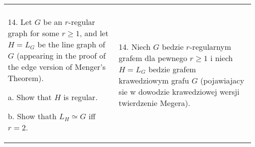 \documentclass{article}[13pt]
\begin{document}
\begin{tabularx}{\textwidth}{ X X }
        & \\

        14. Let $G$ be an $r$-regular graph for some $r\geq1$, and let $H=L_G$ be the line graph of $G$ (appearing in the proof of the edge version of Menger's Theorem). 

        a. Show that $H$ is regular.

        b. Show thath $L_H\simeq G$ iff $r=2$. & 14. Niech $G$ bedzie $r$-regularnym grafem dla pewnego $r\geq1$ i niech $H=L_G$ bedzie grafem krawedziowym grafu $G$ (pojawiajacy sie w dowodzie krawedziowej wersji twierdzenie Megera).

    \end{tabularx}

    \kdowod
\end{document}
